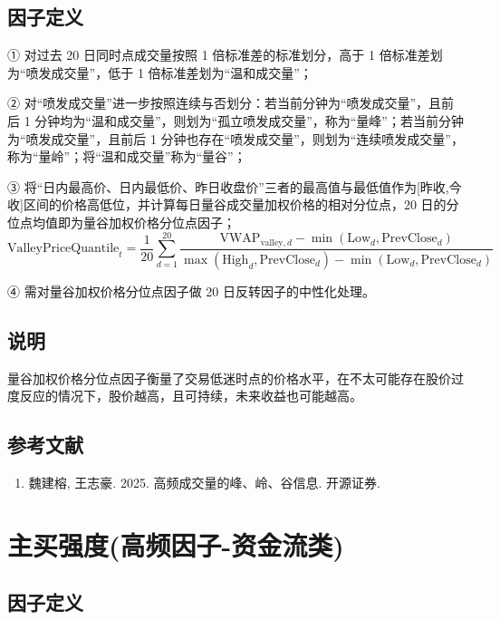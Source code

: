 \documentclass{article}
\begin{document}
\subsection{因子定义}

① 对过去 20 日同时点成交量按照 1 倍标准差的标准划分，高于 1 倍标准差划为“喷发成交量”，低于 1 倍标准差划为“温和成交量”；

② 对“喷发成交量”进一步按照连续与否划分：若当前分钟为“喷发成交量”，且前后 1 分钟均为“温和成交量”，则划为“孤立喷发成交量”，称为“量峰”；若当前分钟为“喷发成交量”，且前后 1 分钟也存在“喷发成交量”，则划为“连续喷发成交量”，称为“量岭”；将“温和成交量”称为“量谷”；

③ 将“日内最高价、日内最低价、昨日收盘价”三者的最高值与最低值作为[昨收,今收]区间的价格高低位，并计算每日量谷成交量加权价格的相对分位点，20 日的分位点均值即为量谷加权价格分位点因子；
\begin{equation}
    \mathrm{ValleyPriceQuantile}_t = \frac{1}{20} \sum_{d=1}^{20} \frac{\mathrm{VWAP}_{\mathrm{valley},d} - \min(\mathrm{Low}_d, \mathrm{PrevClose}_d)}{\max(\mathrm{High}_d, \mathrm{PrevClose}_d) - \min(\mathrm{Low}_d, \mathrm{PrevClose}_d)}
\end{equation}

④ 需对量谷加权价格分位点因子做 20 日反转因子的中性化处理。

\subsection{说明}
量谷加权价格分位点因子衡量了交易低迷时点的价格水平，在不太可能存在股价过度反应的情况下，股价越高，且可持续，未来收益也可能越高。

\subsection{参考文献}
\begin{enumerate}
    \item 魏建榕, 王志豪. 2025. 高频成交量的峰、岭、谷信息. 开源证券.
\end{enumerate}

\section{主买强度(高频因子-资金流类)}

\subsection{因子定义}
\end{document}
